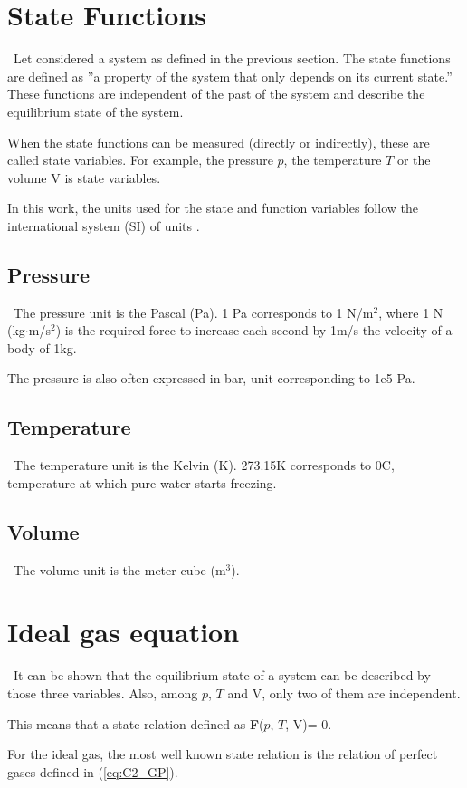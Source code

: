 \section{State Functions}\label{sect:C2_State}
\quad\, Let considered a system as defined in the previous section. The state functions are defined as ''a property of the system that only depends on its current state.” These functions are independent of the past of the system and describe the equilibrium state of the system.

When the state functions can be measured (directly or indirectly), these are called state variables. For example, the pressure $p$, the temperature $T$ or the volume $\mathrm{V}$ is state variables.

In this work, the units used for the state and function variables follow the international system (SI) of units \cite{Nist}. 
\subsection{Pressure}
\quad\, The pressure unit is the Pascal (Pa). 1 Pa corresponds to 1 N/m$^2$, where 1 N (kg$\cdot$m/s$^2$) is the required force to increase each second by 1m/s the velocity of a body of 1kg.

The pressure is also often expressed in bar, unit corresponding to 1e5 Pa.
\subsection{Temperature}
\quad\, The temperature unit is the Kelvin (K). 273.15\degree K corresponds to 0\degree C, temperature at which pure water starts freezing.
\subsection{Volume}
\quad\, The volume unit is the meter cube (m$^3$).
\section{Ideal gas equation}
\quad\, It can be shown that the equilibrium state of a system can be described by those three variables. Also, among $p$,  $T$ and $\mathrm{V}$, only two of them are independent. 

This means that a state relation defined as \textbf{F}($p$, $T$, $\mathrm{V}$)= 0.

For the ideal gas, the most well known state relation is the relation of perfect gases defined in (\ref{eq:C2_GP}).


